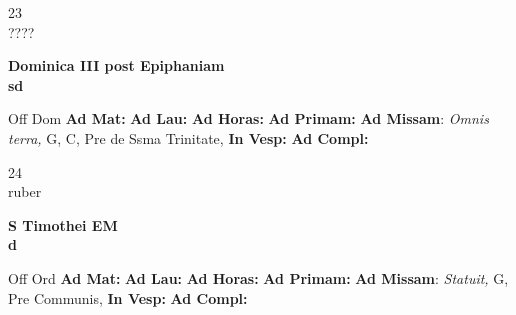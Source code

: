 \documentclass[10pt, openany]{book}
\begin{document}
    \begin{center}
        \begin{minipage}{3.5in}
            \vspace{2em}
            \begin{minipage}{0.5in}
                {\Huge 23} \\
                {\normalsize ????}
            \end{minipage}
            \begin{minipage}{3.0in}
                \textbf{ \large Dominica III post Epiphaniam \\
                \textnormal{\normalsize sd}}

            \end{minipage}
            \begin{justify}Off Dom
                \textbf{Ad Mat: }
                \textbf{Ad Lau: }
                \textbf{Ad Horas: }
                \textbf{Ad Primam: }\textbf{Ad Missam}: \textit{Omnis terra,} G, C, Pre de Ssma Trinitate, 
                \textbf{In Vesp: }
                \textbf{Ad Compl: }
            \end{justify}
        \end{minipage}
    \end{center}

    \begin{center}
        \begin{minipage}{3.5in}
            \vspace{2em}
            \begin{minipage}{0.5in}
                {\Huge 24} \\
                {\normalsize ruber}
            \end{minipage}
            \begin{minipage}{3.0in}
                \textbf{ \large S Timothei EM \\
                \textnormal{\normalsize d}}

            \end{minipage}
            \begin{justify}Off Ord
                \textbf{Ad Mat: }
                \textbf{Ad Lau: }
                \textbf{Ad Horas: }
                \textbf{Ad Primam: }\textbf{Ad Missam}: \textit{Statuit,} G, Pre Communis, 
                \textbf{In Vesp: }
                \textbf{Ad Compl: }
            \end{justify}
        \end{minipage}
    \end{center}
\end{document}
